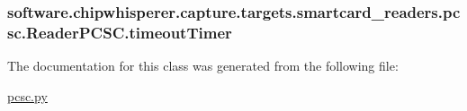 \subsubsection[{timeout\+Timer}]{\setlength{\rightskip}{0pt plus 5cm}software.\+chipwhisperer.\+capture.\+targets.\+smartcard\+\_\+readers.\+pcsc.\+Reader\+P\+C\+S\+C.\+timeout\+Timer}\label{classsoftware_1_1chipwhisperer_1_1capture_1_1targets_1_1smartcard__readers_1_1pcsc_1_1ReaderPCSC_ab9366ef70373d5c8770f93fec7dc3b3d}


The documentation for this class was generated from the following file\+:\begin{DoxyCompactItemize}
\item 
\hyperlink{pcsc_8py}{pcsc.\+py}\end{DoxyCompactItemize}

